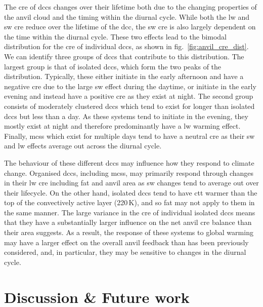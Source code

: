 The \acrshort{cre} of \acrshort{dcc}s changes over their lifetime both due to the changing properties of the anvil cloud and the timing within the diurnal cycle.
While both the \acrshort{lw} and \acrshort{sw} \acrshort{cre} reduce over the lifetime of the \acrshort{dcc}, the \acrshort{sw} \acrshort{cre} is also largely dependent on the time within the diurnal cycle.
These two effects lead to the bimodal distribution for the \acrshort{cre} of individual \acrshort{dcc}s, as shown in fig.~\ref{fig:anvil_cre_dist}.
We can identify three groups of \acrshort{dcc}s that contribute to this distribution.
The largest group is that of isolated \acrshort{dcc}s, which form the two peaks of the distribution.
Typically, these either initiate in the early afternoon and have a negative \acrshort{cre} due to the large \acrshort{sw} effect during the daytime, or initiate in the early evening and instead have a positive \acrshort{cre} as they exist at night.
The second group consists of moderately clustered \acrshort{dcc}s which tend to exist for longer than isolated \acrshort{dcc}s but less than a day.
As these systems tend to initiate in the evening, they mostly exist at night and therefore predominantly have a \acrshort{lw} warming effect.
Finally, \acrshort{mcs}s which exist for multiple days tend to have a neutral \acrshort{cre} as their \acrshort{sw} and \acrshort{lw} effects average out across the diurnal cycle.

The behaviour of these different \acrshort{dcc}s may influence how they respond to climate change.
Organised \acrshort{dcc}s, including \acrshort{mcs}s, may primarily respond through changes in their \acrshort{lw} \acrshort{cre} including \acrshort{fat} and anvil area as \acrshort{sw} changes tend to average out over their lifecycle.
On the other hand, isolated \acrshort{dcc}s tend to have \acrshort{ctt} warmer than the top of the convectively active layer (220\,\unit{K}), and so \acrshort{fat} may not apply to them in the same manner.
The large variance in the \acrshort{cre} of individual isolated \acrshort{dcc}s means that they have a substantially larger influence on the net anvil \acrshort{cre} balance than their area suggests.
As a result, the response of these systems to global warming may have a larger effect on the overall anvil feedback than has been previously considered, and, in particular, they may be sensitive to changes in the diurnal cycle.


\section{Discussion \& Future work}

